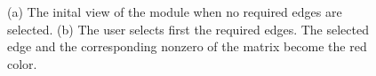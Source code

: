 \documentclass[12pt, twoside,a4paper,toc=bibliography]{scrbook}
\begin{document}
\begin{figure}
\centering
{}
\hfill
{}
\caption{
(a) The inital view of the module when no required edges are selected.
(b) The user selects first the required edges. The selected edge and the corresponding
nonzero of the matrix become the red color.}
\label{partial_coloring_bad_coloring}
\end{figure}
\end{document}
